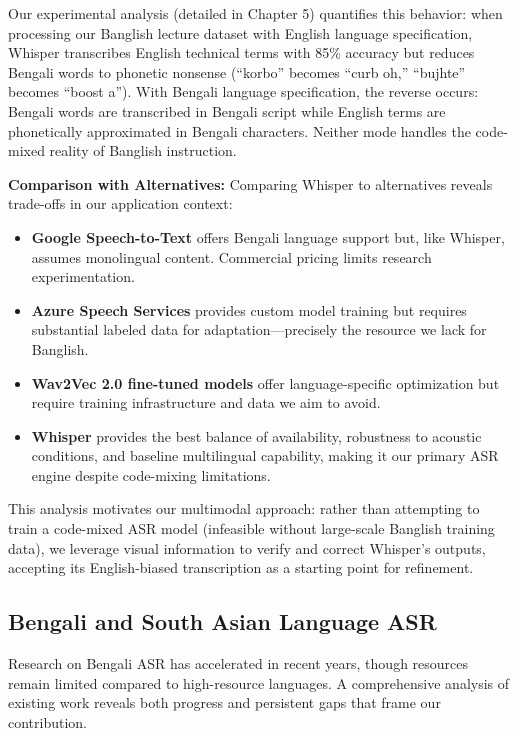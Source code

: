 Our experimental analysis (detailed in Chapter 5) quantifies this behavior: when processing our Banglish lecture dataset with English language specification, Whisper transcribes English technical terms with 85\% accuracy but reduces Bengali words to phonetic nonsense (``korbo'' becomes ``curb oh,'' ``bujhte'' becomes ``boost a''). With Bengali language specification, the reverse occurs: Bengali words are transcribed in Bengali script while English terms are phonetically approximated in Bengali characters. Neither mode handles the code-mixed reality of Banglish instruction.

\textbf{Comparison with Alternatives:} Comparing Whisper to alternatives reveals trade-offs in our application context:

\begin{itemize}
    \item \textbf{Google Speech-to-Text} offers Bengali language support but, like Whisper, assumes monolingual content. Commercial pricing limits research experimentation.
    \item \textbf{Azure Speech Services} provides custom model training but requires substantial labeled data for adaptation---precisely the resource we lack for Banglish.
    \item \textbf{Wav2Vec 2.0 fine-tuned models} offer language-specific optimization but require training infrastructure and data we aim to avoid.
    \item \textbf{Whisper} provides the best balance of availability, robustness to acoustic conditions, and baseline multilingual capability, making it our primary ASR engine despite code-mixing limitations.
\end{itemize}

This analysis motivates our multimodal approach: rather than attempting to train a code-mixed ASR model (infeasible without large-scale Banglish training data), we leverage visual information to verify and correct Whisper's outputs, accepting its English-biased transcription as a starting point for refinement.

\subsection{Bengali and South Asian Language ASR}

Research on Bengali ASR has accelerated in recent years, though resources remain limited compared to high-resource languages. A comprehensive analysis of existing work reveals both progress and persistent gaps that frame our contribution.

